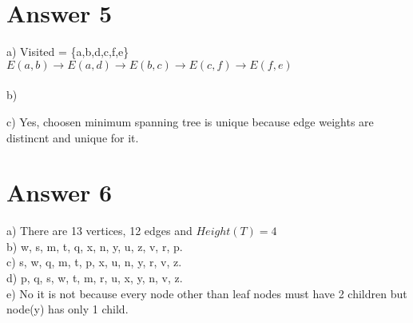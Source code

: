 \documentclass[12pt]{article}
\begin{document}
\newpage
\section*{Answer 5}
a) Visited = \{a,b,d,c,f,e\} \\
$E(a,b) \rightarrow E(a,d) \rightarrow E(b,c) \rightarrow E(c,f) \rightarrow E(f,e)$ \\
\\ b) 
\begin{figure}[H]
	\centering
\end{figure}



c) Yes, choosen minimum spanning tree is unique because edge weights are distincnt and unique for it.

\section*{Answer 6}
a) There are 13 vertices, 12 edges and $Height(T)=4$ \\
b) w, s, m, t, q, x, n, y, u, z, v, r, p. \\
c) s, w, q, m, t, p, x, u, n, y, r, v, z. \\
d) p, q, s, w, t, m, r, u, x, y, n, v, z. \\
e) No it is not because every node other than leaf nodes must have 2 children but node(y) has only 1 child.\\
\end{document}
